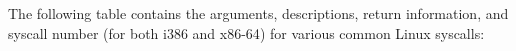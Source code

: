 \documentclass{article}
\begin{document}
\newcommand{\sysentry}[6]{
  \begin{tabular}[t]{>{\centering\arraybackslash}p{0.8\linewidth}|>{\centering\arraybackslash}p{0.2\linewidth}}
    \begin{tabular}[t]{p{\linewidth}}
      \begin{tabular}[t]{*{3}{>{\centering\arraybackslash}p{0.249\linewidth}|}>{\centering\arraybackslash}p{0.249\linewidth}}
        \texttt{#1} & \texttt{#2} & \texttt{#3} & \texttt{#4}
      \end{tabular} \\ \hline
      \setlength{\tabcolsep}{6pt}
      \begin{tabular}[t]{p{0.97\linewidth}}
        #5
      \end{tabular}
      \setlength{\tabcolsep}{0pt}
    \end{tabular} &
    \setlength{\tabcolsep}{6pt}
    \begin{tabular}[t]{p{\dimexpr\linewidth-12pt\relax}}
      #6
    \end{tabular}
    \setlength{\tabcolsep}{0pt}
  \end{tabular} \\ \hline
}

The following table contains the arguments, descriptions, return information, and syscall number (for both i386\cite{syscall-number-32} and x86-64\cite{syscall-number-64}) for various common Linux syscalls:
\end{document}
